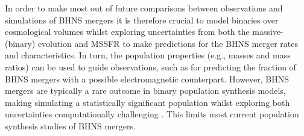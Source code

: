 \documentclass[twocolumn]{aastex63}
\newcommand{\floor}[1]{\textbf{\textcolor{magenta}{[Floor: #1]}}}
\newcommand\bhnsSingle{BHNS\xspace}
\begin{document}
In order to make most out of future comparisons between observations and simulations of \bhnsSingle mergers  it is therefore crucial to model binaries over cosmological volumes  whilst exploring  uncertainties from both the massive- (binary) evolution and \ac{MSSFR}  to make predictions for the \bhnsSingle merger rates and characteristics. In turn, the population properties (e.g., masses and mass ratios) can be used to guide observations, such as for predicting the fraction of \bhnsSingle mergers with a possible electromagnetic counterpart.
However,  \bhnsSingle mergers are typically a rare outcome in binary population synthesis models, making simulating a statistically significant population whilst exploring both uncertainties computationally challenging \citep[see e.g. discussions in][]{andrews2017dart_board, 2017IAUS..325...46B, 2018arXiv180608365T,2019MNRAS.490.5228B}. This limits most current population synthesis studies of \bhnsSingle mergers.  

\end{document}
